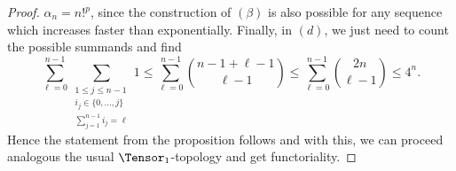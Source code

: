 \documentclass[
11pt,                          %
english                        %
]{article}
\begin{document}
\begin{proof}
	$\alpha_n = n!^p$, since the construction of $(\beta)$ is also possible for any 
	sequence which increases faster than exponentially. 
	Finally, in $(d)$, we just need to count the possible summands and find
	\begin{equation*}
		\sum\limits_{\ell = 0}^{n-1}
		\sum\limits_{\substack{
			1 \leq j \leq n-1 \\
			i_j \in \{0, \ldots, j\} \\
			\sum_{j=1}^{n-1} i_j = \ell
		}}
		1
		\leq
		\sum\limits_{\ell = 0}^{n-1}
		\binom{n - 1 + \ell - 1}{\ell - 1}
		\leq
		\sum\limits_{\ell = 0}^{n-1}
		\binom{2 n}{\ell - 1}
		\leq
		4^n.
	\end{equation*}
	Hence the statement from the proposition follows and with this, we can proceed 
	analogous the usual $\Tensor_1$-topology and get functoriality.
\end{proof}
\end{document}
